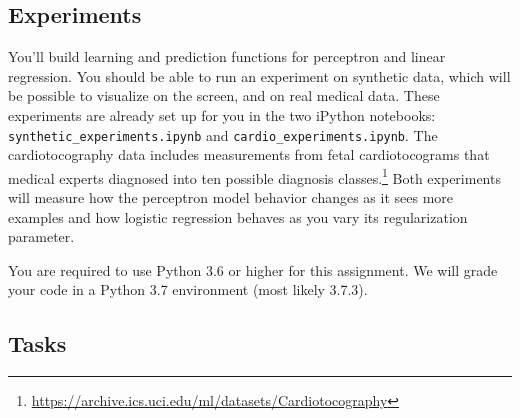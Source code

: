 \documentclass[10pt]{article}
\begin{document}
\subsection*{Experiments}

You'll build learning and prediction functions for perceptron and linear regression. You should be able to run an experiment on synthetic data, which will be possible to visualize on the screen, and on real medical data. These experiments are already set up for you in the two iPython notebooks: \texttt{synthetic\_experiments.ipynb} and \texttt{cardio\_experiments.ipynb}. The cardiotocography data includes measurements from fetal cardiotocograms that medical experts diagnosed into ten possible diagnosis classes.\footnote{\url{https://archive.ics.uci.edu/ml/datasets/Cardiotocography}} Both experiments will measure how the perceptron model behavior changes as it sees more examples and how logistic regression behaves as you vary its regularization parameter. 

You are required to use Python 3.6 or higher for this assignment. We will grade your code in a Python 3.7 environment (most likely 3.7.3).

\subsection*{Tasks}
\end{document}
